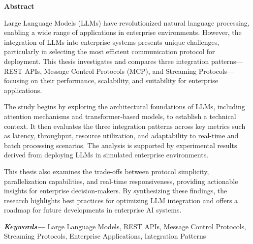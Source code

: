 \vspace*{4cm}
\begin{center}
    {\Large\bf Abstract}
\end{center} \vskip 0.5cm \vskip 0.5cm
Large Language Models (LLMs) have revolutionized natural language processing, enabling a wide range of applications in enterprise environments. However, the integration of LLMs into enterprise systems presents unique challenges, particularly in selecting the most efficient communication protocol for deployment. This thesis investigates and compares three integration patterns—REST APIs, Message Control Protocols (MCP), and Streaming Protocols—focusing on their performance, scalability, and suitability for enterprise applications.

The study begins by exploring the architectural foundations of LLMs, including attention mechanisms and transformer-based models, to establish a technical context. It then evaluates the three integration patterns across key metrics such as latency, throughput, resource utilization, and adaptability to real-time and batch processing scenarios. The analysis is supported by experimental results derived from deploying LLMs in simulated enterprise environments.

This thesis also examines the trade-offs between protocol simplicity, parallelization capabilities, and real-time responsiveness, providing actionable insights for enterprise decision-makers. By synthesizing these findings, the research highlights best practices for optimizing LLM integration and offers a roadmap for future developments in enterprise AI systems.

\providecommand{\keywords}[1] {
  \small	
  \textbf{\textit{Keywords---}} #1
}
\keywords{Large Language Models, REST APIs, Message Control Protocols, Streaming Protocols, Enterprise Applications, Integration Patterns}
